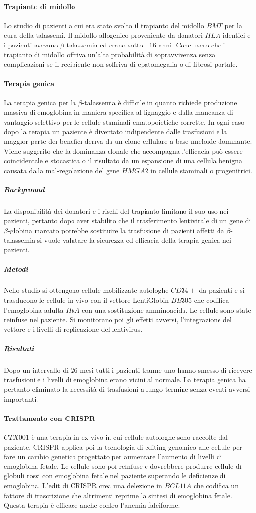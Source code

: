 \paragraph{Trapianto di midollo}
Lo studio di pazienti a cui era stato svolto il trapianto del midollo $BMT$ per la cura della talassemi. Il midollo allogenico proveniente da donatori $HLA$-identici e i pazienti 
avevano $\beta$-talassemia ed erano sotto i $16$ anni. Conclusero che il trapianto di midollo offriva un'alta probabilit\`a di sopravvivenza senza complicazioni se il recipiente non
soffriva di epatomegalia o di fibrosi portale. 
\paragraph{Terapia genica}
La terapia genica per la $\beta$-talassemia \`e difficile in quanto richiede produzione massiva di emoglobina in maniera specifica al lignaggio e dalla mancanza di vantaggio selettivo
per le cellule staminali ematopoietiche corrette. In ogni caso dopo la terapia un paziente \`e diventato indipendente dalle trasfusioni e la maggior parte dei benefici deriva da
un clone cellulare a base mieloide dominante. Viene suggerito che la dominanza clonale che accompagna l'efficacia pu\`o essere coincidentale e stocastica o il risultato da un
espansione di una cellula benigna causata dalla mal-regolazione del gene $HMGA2$ in cellule staminali o progenitrici. 
\subparagraph{Background}
La disponibilit\`a dei donatori e i rischi del trapianto limitano il suo uso nei pazienti, pertanto dopo aver stabilito che il trasferimento lentivirale di un gene di $\beta$-globina
marcato potrebbe sostituire la trasfusione di pazienti affetti da $\beta$-talassemia si vuole valutare la sicurezza ed efficacia della terapia genica nei pazienti. 
\subparagraph{Metodi}
Nello studio si ottengono cellule mobilizzate autologhe $CD34+$ da pazienti e si trasducono le cellule in vivo con il vettore LentiGlobin $BB305$ che codifica l'emoglobina adulta
$HbA$ con una sostituzione amminoacida. Le cellule sono state reinfuse nel paziente. Si monitorano poi gli effetti avversi, l'integrazione del vettore e i livelli di replicazione del
lentivirus. 
\subparagraph{Risultati}
Dopo un intervallo di $26$ mesi tutti i pazienti tranne uno hanno smesso di ricevere trasfusioni e i livelli di emoglobina erano vicini al normale. La terapia genica ha pertanto 
eliminato la necessit\`a di trasfusioni a lungo termine senza eventi avversi importanti. 
\paragraph{Trattamento con CRISPR}
$CTX001$ \`e una terapia in ex vivo in cui cellule autologhe sono raccolte dal paziente, CRISPR applica poi la tecnologia di editing genomico alle cellule per fare un cambio genetico
progettato per aumentare l'aumento di livelli di emoglobina fetale. Le cellule sono poi reinfuse e dovrebbero produrre cellule di globuli rossi con emoglobina fetale nel paziente
superando le deficienze di emoglobina. L'edit di CRISPR crea una delezione in $BCL11A$ che codifica un fattore di trascrizione che altrimenti reprime la sintesi di emoglobina fetale. 
Questa terapia \`e efficace anche contro l'anemia falciforme. 
